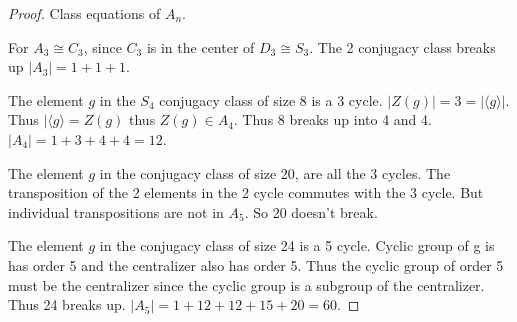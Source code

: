 \documentclass{article}
\begin{document}
\begin{proof}
    Class equations of $A_n$.

    For $A_3 \cong C_3$, since $C_3$ is in the center of $D_3 \cong S_3$. The 2 conjugacy class breaks up
    $|A_3| = 1 + 1 + 1$. 

    The element $g$ in the $S_4$ conjugacy class of size 8 is a 3 cycle. $|Z(g)| = 3 = |\langle g \rangle|$. Thus $|\langle g \rangle = Z(g)$ thus $Z(g) \in A_4$. Thus 8 breaks up into 4 and 4.
    $|A_4| = 1 + 3 + 4 + 4 = 12$. 

    The element $g$ in the conjugacy class of size 20, are all the 3 cycles. The transposition of the 2 elements in the 2 cycle commutes with the 3 cycle. But individual transpositions are not in $A_5$. So 20 doesn't break.

    The element $g$ in the conjugacy class of size 24 is a 5 cycle. Cyclic group of g is has order 5 and the centralizer also has order 5. Thus the cyclic group of order 5 must be the centralizer since the cyclic group is a subgroup of the centralizer. Thus 24 breaks up.
    $|A_5| = 1  + 12 + 12 + 15 + 20 = 60$.
\end{proof}




\bigskip
\end{document}
